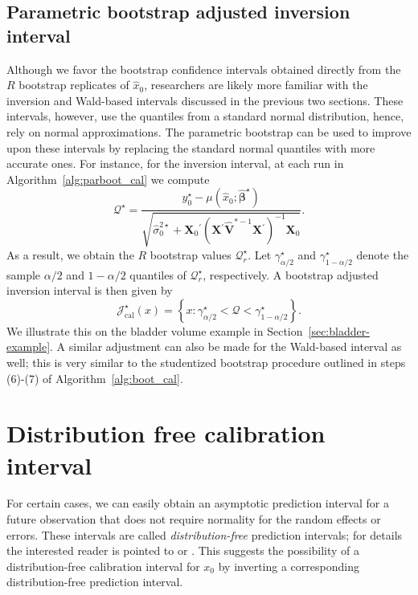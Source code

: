 \documentclass[cmfont,usenames,dvipsnames,leqno]{afit-etd}\usepackage[]{graphicx}\usepackage[]{color}
\newcommand{\boot}{\star} %
\newcommand{\trans}{\ensuremath{^\prime}}
\newcommand{\mc}[1]{\ensuremath{\mathcal{#1}}}
\newcommand{\wh}[1]{\ensuremath{\widehat{#1}}}
\newcommand{\X}{\ensuremath{\bm{X}}}
\begin{document}
\subsection{Parametric bootstrap adjusted inversion interval}
Although we favor the bootstrap confidence intervals obtained directly from the $R$ bootstrap replicates of $\wh{x}_0$, researchers are likely more familiar with the inversion and Wald-based intervals discussed in the previous two sections. These intervals, however, use the quantiles from a standard normal distribution, hence, rely on normal approximations. The parametric bootstrap can be used to improve upon these intervals by replacing the standard normal quantiles with more accurate ones. For instance, for the inversion interval, at each run in Algorithm~\ref{alg:parboot_cal} we compute
\begin{equation*}
  \mc{Q}^\boot = \frac{y_0^\boot - \mu\left(\wh{x}_0; \wh{\bm{\beta}}^\boot\right)}{\sqrt{\wh{\sigma}_0^{2\boot} + \X_0\trans\left(\X\trans\wh{\bm{V}}^{*-1}\X\trans\right)^{-1}\X_0}}.
\end{equation*}
As a result, we obtain the $R$ bootstrap values $\mc{Q}_r^\boot$. Let $\gamma_{\alpha/2}^\boot$ and $\gamma_{1-\alpha/2}^\boot$ denote the sample $\alpha/2$ and $1-\alpha/2$ quantiles of $\mc{Q}_r^\boot$, respectively. A bootstrap adjusted inversion interval is then given by
\begin{equation}
\label{eqn:cal-lmm-inversion-boot}
  \mc{J}_\mathrm{cal}^\boot(x) = \left\{ x: \gamma_{\alpha/2}^\boot < \mc{Q} < \gamma_{1-\alpha/2}^\boot \right\}.
\end{equation}
We illustrate this on the bladder volume example in Section~\ref{sec:bladder-example}. A similar adjustment can also be made for the Wald-based interval as well; this is very similar to the studentized bootstrap procedure outlined in steps (6)-(7) of Algorithm~\ref{alg:boot_cal}.

\section{Distribution free calibration interval}
\label{sec:calibration-lmm-distfree}
For certain cases, we can easily obtain an asymptotic prediction interval for a future observation that does not require normality for the random effects or errors. These intervals are called \textit{distribution-free} prediction intervals; for details the interested reader is pointed to \citet{jiang_distribution_2002} or \citet{jiang_linear_2007}. This suggests the possibility of a distribution-free calibration interval for $x_0$ by inverting a corresponding distribution-free prediction interval.
\end{document}
